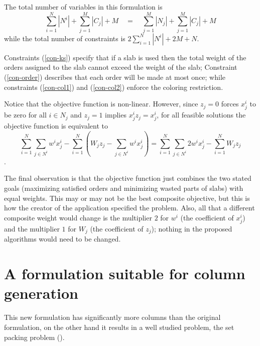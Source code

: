 The total number of variables in this formulation is 
$$
\sum_{i=1}^{N} |N^i| + \sum_{j=1}^{M} |C_j| + M \quad=\quad 
\sum_{j=1}^{M} |N_j| + \sum_{j=1}^{M} |C_j| + M
$$
while the total number of constraints is $2\sum_{i=1}^{N} |N^i| + 2M + N$.

Constraints (\ref{con-ks}) specify that if a slab is used then the total
weight of the orders assigned to the slab cannot exceed the weight of the
slab; Constraint (\ref{con-order}) describes that each order will be made at
most once; while constraints (\ref{con-col1}) and (\ref{con-col2}) enforce the
coloring restriction.

Notice that the objective function is non-linear. However, since $z_j = 0$
forces $x^i_j$ to be zero for all $i \in N_j$ and $z_j = 1$ implies
$x^i_j z_j = x^i_j$, for all feasible solutions the objective function is
equivalent to 
$$
\sum_{i = 1}^{N}\sum_{j \in N^i} w^i x^i_j -
    \sum_{i = 1}^{N} ( W_j z_j - \sum_{j \in N^i} w^i x^i_j ) =
\sum_{i = 1}^{N}\sum_{j \in N^i} 2w^i x^i_j - \sum_{i = 1}^{N} W_j z_j 
$$.

The final observation is that the objective function just combines the two
stated goals (maximizing satisfied orders and minimizing wasted parts of
slabs) with equal weights. This may or may not be the best composite
objective, but this is how the creator of the application specified the
problem. Also, all that a different composite weight would change is the
multiplier $2$ for $w^i$ (the coefficient of $x^i_j$) and the multiplier $1$
for $W_j$ (the coefficient of $z_j$); nothing in the proposed algorithms would
need to be changed.


\section{A formulation suitable for column generation}

This new formulation has significantly more columns than the original
formulation, on the other hand it results in a well studied problem, the set
packing problem (\cite{NW}).

